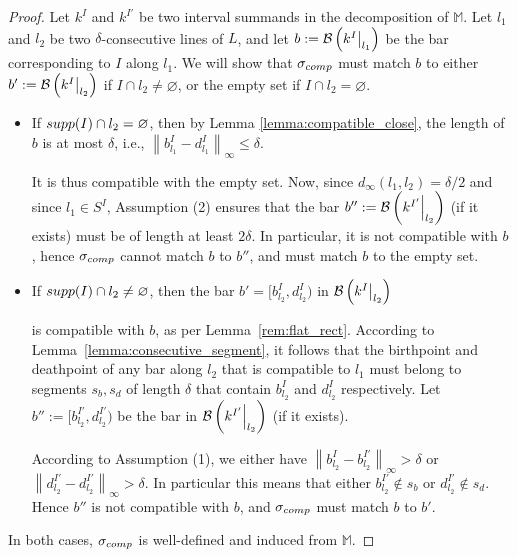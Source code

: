 \documentclass{article}
\newcommand{\field}{k}
\newcommand{\norm}[1]{\left\lVert #1 \right\rVert}
\newcommand{\barcode}[1]{ {\mathcal B}\left(#1\right) }
\newcommand{\induced}[1]{\field^{#1}}
\newcommand{\matching}{\sigma}
\newcommand{\Mbb}{\mathbb{M}}
\newcommand{\M}{{\mathbb M}}
\newcommand{\supp}[1]{ {\rm supp}(#1) }
\newcommand\restr[2]{{  \left.\kern-\nulldelimiterspace #1 \vphantom{\big|} \right|_{#2}  }}
\newcommand{\rebuttal}[1]{{ #1}}
\begin{document}
\begin{proof}
	Let $\induced I$ and $\induced{I'}$ be two interval summands in the decomposition of $\M$.
	Let $l_1$ and $l_2$ be two $\delta$-consecutive lines of $L$, and let $b:=\barcode{\restr{\induced{I}}{l_1}}$ be the bar corresponding to  $I$  along $l_1$.
	We will show that $\matching_{\rm comp}$ must match $b$ to either $b':=\barcode{\restr{\induced{I}}{l_2}}$ if ${I}\cap l_2\neq\varnothing$, or the empty set if ${I}\cap l_2 = \varnothing$.

	\begin{itemize}
		\item[$\bullet$] If $ \supp{I}\cap l_2 = \varnothing$, then
		      by Lemma \ref{lemma:compatible_close},
		      the length of $b$ is at most $\delta$, i.e., $\norm{b^I_{l_1}-d^I_{l_1}}_\infty \le \delta$.

		      It is thus compatible with the empty set.
		      Now,
		      since $d_\infty(l_1,l_2)=\delta/2$ and since $l_1\in S^I$,
		      Assumption (2) ensures that the bar $b'':= \barcode{\restr{\induced{I'}}{l_2}}$ (if it exists) must be of length at least $2\delta$. %
		      In particular, it is not compatible with $b$, hence $\matching_{\rm comp}$ cannot match $b$ to $b''$, and must match $b$ to the empty set.



		\item[$\bullet$] If $ \supp{I} \cap l_2 \neq \varnothing$, then
		      the bar $b'=[b^I_{l_2},d^I_{l_2})$ in $\barcode{\restr{\induced{I}}{l_2}}$

		      is compatible with $b$, as per Lemma~\ref{rem:flat_rect}.
		      According to Lemma~\ref{lemma:consecutive_segment}, it follows that the birthpoint and deathpoint of any
		      bar along $l_2$ that is compatible to $l_1$ must belong to segments $s_b, s_d$ of length $\delta$ that contain
		      $b^I_{l_2}$ and $d^I_{l_2}$ respectively.
		      Let $b'':=[b^{I'}_{l_2}, d^{I'}_{l_2})$ be the bar in $\barcode{\restr{\induced{I'}}{l_2}}$ (if it exists).

		      According to Assumption (1), we either have $ \norm{ b_{l_2}^I - b_{l_2}^{I'}}_{\infty}>\delta$ or $ \norm{ d_{l_2}^{I'} - d_{l_2}^{I'}}_{\infty} > \delta$.
		      In particular this means that either $b^{I'}_{l_2}\not\in s_b$ or $d^{I'}_{l_2}\not\in s_d$.
		      Hence $b''$ is not compatible with $b$, and $\matching_{\rm comp}$ must match $b$ to $b'$.


	\end{itemize}
	In both cases, $\matching_{\rm comp}$ is well-defined and \rebuttal{induced from $\Mbb$}.
\end{proof}
\end{document}
